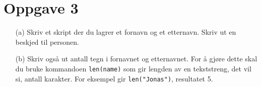 \documentclass[a4paper, 11pt, notitlepage, english]{article}
\begin{document}
\section*{Oppgave 3}
\begin{itemize}
    \item[(a)] Skriv et skript der du lagrer et fornavn og et etternavn. Skriv ut en beskjed til personen.
    \item[(b)] Skriv også ut antall tegn i fornavnet og etternavnet. For å gjøre dette skal du bruke kommandoen \verb+len(name)+ som gir lengden av en tekststreng, det vil si, antall karakter. For eksempel gir \verb+len("Jonas")+, resultatet 5.
\end{itemize}
\end{document}
